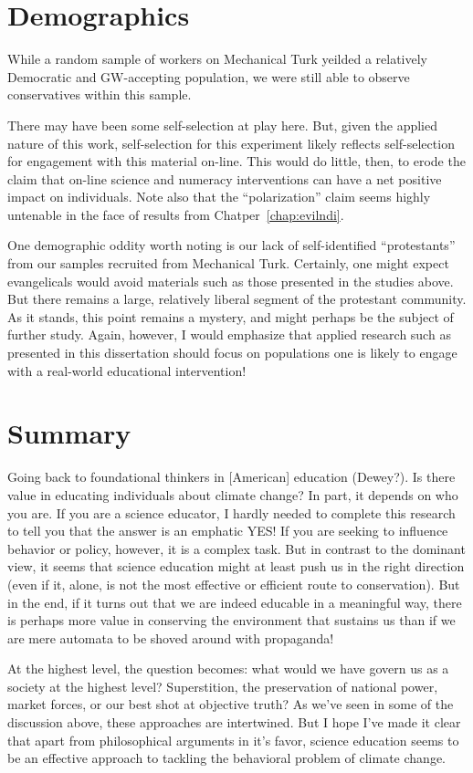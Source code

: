 \section{Demographics}

While a random sample of workers on Mechanical Turk yeilded a relatively
Democratic and GW-accepting population, we were still able to observe
conservatives within this sample.

There may have been some self-selection at play here. But, given the applied
nature of this work, self-selection for this experiment likely reflects
self-selection for engagement with this material on-line. This would do little,
then, to erode the claim that on-line science and numeracy interventions can
have a net positive impact on individuals. Note also that the “polarization”
claim seems highly untenable in the face of results from
Chatper~\ref{chap:evilndi}.

One demographic oddity worth noting is our lack of self-identified “protestants”
from our samples recruited from Mechanical Turk. Certainly, one might expect
evangelicals would avoid materials such as those presented in the studies above.
But there remains a large, relatively liberal segment of the protestant
community. As it stands, this point remains a mystery, and might perhaps be the
subject of further study. Again, however, I would emphasize that applied
research such as presented in this dissertation should focus on populations one
is likely to engage with a real-world educational intervention!

\section{Summary}

Going back to foundational thinkers in [American] education (Dewey?). Is there
value in educating individuals about climate change? In part, it depends on who
you are. If you are a science educator, I hardly needed to complete this
research to tell you that the answer is an emphatic YES! If you are seeking to
influence behavior or policy, however, it is a complex task. But in contrast to
the dominant view, it seems that science education might at least push us in the
right direction (even if it, alone, is not the most effective or efficient route
to conservation). But in the end, if it turns out that we are indeed educable in
a meaningful way, there is perhaps more value in conserving the environment that
sustains us than if we are mere automata to be shoved around with propaganda!

At the highest level, the question becomes: what would we have govern us as a
society at the highest level? Superstition, the preservation of national power,
market forces, or our best shot at objective truth? As we've seen in some of the
discussion above, these approaches are intertwined. But I hope I've made it
clear that apart from philosophical arguments in it's favor, science education
seems to be an effective approach to tackling the behavioral problem of climate
change.
